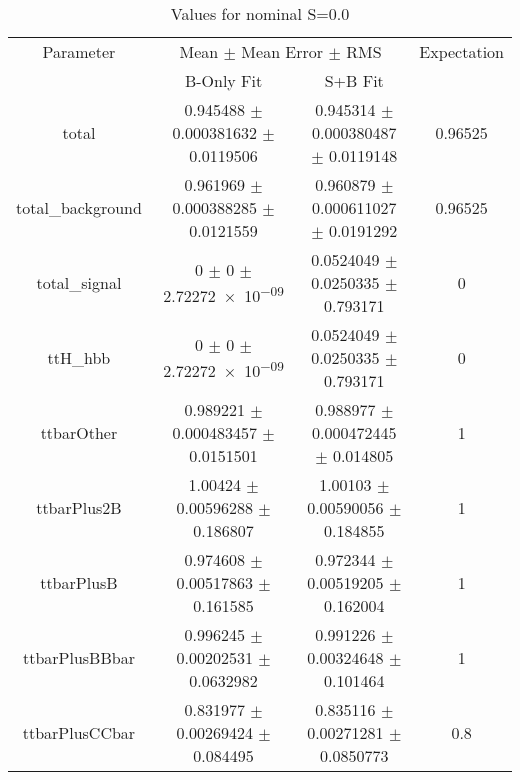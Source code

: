 \begin{table}
\centering
\caption{Values for nominal S=0.0}
\begin{tabular}{cccc}
\toprule
Parameter & \multicolumn{2}{c}{Mean $\pm$ Mean Error $\pm$ RMS} & Expectation\\
 & B-Only Fit & S+B Fit & \\
\midrule
total & \num{0.945488} $\pm$ \num{0.000381632} $\pm$ \num{0.0119506} & \num{0.945314} $\pm$ \num{0.000380487} $\pm$ \num{0.0119148} & \num{0.96525}\\
total\_background & \num{0.961969} $\pm$ \num{0.000388285} $\pm$ \num{0.0121559} & \num{0.960879} $\pm$ \num{0.000611027} $\pm$ \num{0.0191292} & \num{0.96525}\\
total\_signal & \num{0} $\pm$ \num{0} $\pm$ \num{2.72272e-09} & \num{0.0524049} $\pm$ \num{0.0250335} $\pm$ \num{0.793171} & \num{0}\\
ttH\_hbb & \num{0} $\pm$ \num{0} $\pm$ \num{2.72272e-09} & \num{0.0524049} $\pm$ \num{0.0250335} $\pm$ \num{0.793171} & \num{0}\\
ttbarOther & \num{0.989221} $\pm$ \num{0.000483457} $\pm$ \num{0.0151501} & \num{0.988977} $\pm$ \num{0.000472445} $\pm$ \num{0.014805} & \num{1}\\
ttbarPlus2B & \num{1.00424} $\pm$ \num{0.00596288} $\pm$ \num{0.186807} & \num{1.00103} $\pm$ \num{0.00590056} $\pm$ \num{0.184855} & \num{1}\\
ttbarPlusB & \num{0.974608} $\pm$ \num{0.00517863} $\pm$ \num{0.161585} & \num{0.972344} $\pm$ \num{0.00519205} $\pm$ \num{0.162004} & \num{1}\\
ttbarPlusBBbar & \num{0.996245} $\pm$ \num{0.00202531} $\pm$ \num{0.0632982} & \num{0.991226} $\pm$ \num{0.00324648} $\pm$ \num{0.101464} & \num{1}\\
ttbarPlusCCbar & \num{0.831977} $\pm$ \num{0.00269424} $\pm$ \num{0.084495} & \num{0.835116} $\pm$ \num{0.00271281} $\pm$ \num{0.0850773} & \num{0.8}\\
\bottomrule
\end{tabular}
\end{table}
